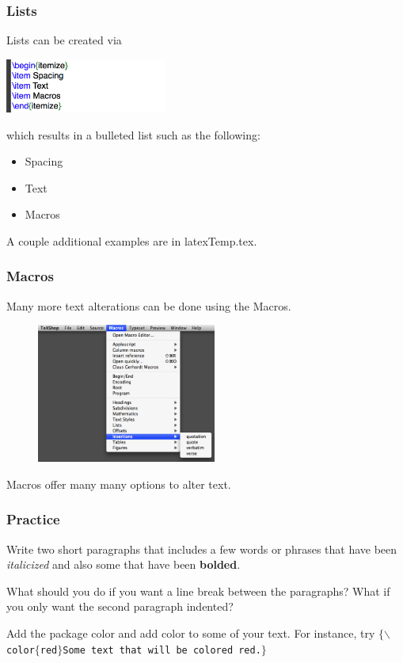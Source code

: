 \documentclass[slidestop,compress,mathserif]{beamer}
\begin{document}
\begin{frame} \frametitle{Lists}
Lists can be created via
\begin{center}
\includegraphics[height=0.7in]{basicsOfLatex/general/list}
\end{center}
which results in a bulleted list such as the following:
\begin{itemize}
\item Spacing
\item Text
\item Macros
\end{itemize}
A couple additional examples are in {\color{highlight}latexTemp.tex}.
\end{frame}

\begin{frame} \frametitle{Macros}
Many more text alterations can be done using the Macros.
\begin{figure}[htbp]
   \centering
   \includegraphics[height=1.8in]{basicsOfLatex/general/macros}
\end{figure}
Macros offer many many options to alter text.
\end{frame}

\begin{frame} \frametitle{Practice}
Write two short paragraphs that includes a few words or phrases that have been \textit{italicized} and also some that have been \textbf{bolded}.

\vspace{7mm}

What should you do if you want a line break between the paragraphs? What if you only want the second paragraph indented?

\vspace{7mm}

Add the package {\color{highlight}color} and add color to some of your text. For instance, try 
\texttt{\color{braces}$\{$\color{command}$\backslash$color\color{braces}$\{$\color{black}red\color{braces}$\}$\color{black}Some text that will be colored red.\color{braces}$\}$}
\end{frame}
\end{document}

